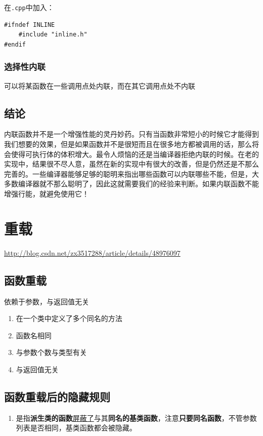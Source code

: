 \documentclass[UTF8,a4paper,12pt]{ctexbook} %
\begin{document}
			 在\verb|.cpp|中加入：   
			 \begin{lstlisting}
#ifndef INLINE
	#include "inline.h"
#endif
			 \end{lstlisting}
		    
	    \subsection{选择性内联}
	      可以将某函数在一些调用点处内联，而在其它调用点处不内联
    \section{结论}
       内联函数并不是一个增强性能的灵丹妙药。只有当函数非常短小的时候它才能得到我们想要的效果，但是如果函数并不是很短而且在很多地方都被调用的话，那么将会使得可执行体的体积增大。最令人烦恼的还是当编译器拒绝内联的时候。在老的实现中，结果很不尽人意，虽然在新的实现中有很大的改善，但是仍然还是不那么完善的。一些编译器能够足够的聪明来指出哪些函数可以内联哪些不能，但是，大多数编译器就不那么聪明了，因此这就需要我们的经验来判断。如果内联函数不能增强行能，就避免使用它！
       
       
\chapter{重载}
	\url{http://blog.csdn.net/zx3517288/article/details/48976097}
    \section{函数重载}依赖于参数，与返回值无关
       
       \begin{enumerate}[fullwidth,itemindent=2em]
       	\item  在一个类中定义了多个同名的方法
       	\item  函数名相同
       	\item  与参数个数与类型有关
       	\item  与返回值无关
       \end{enumerate}
       
    \section{函数重载后的隐藏规则}
	    
	    \begin{enumerate}
	    	\item 是指\textbf{派生类的函数}\underline{屏蔽了}与其\textbf{同名的基类函数}，注意\textbf{只要同名函数}，不管参数列表是否相同，基类函数都会被隐藏。
	    \end{enumerate}   
        
\end{document}
